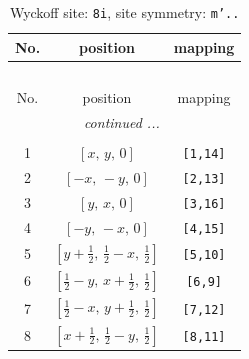 \documentclass[fleqn,8pt]{jsarticle}
\begin{document}
\renewcommand{\arraystretch}{1.2}
\begin{longtable}{ccc}
\caption{Wyckoff site: {\tt 8i}, site symmetry: {\tt m'..}}
 \\
 \hline \hline
No. & position & mapping \\ \hline \endfirsthead

\multicolumn{2}{l}{\tablename\ \thetable{}} \\
 \hline \hline
No. & position & mapping \\ \hline \endhead

 \hline \hline
\multicolumn{2}{r}{\footnotesize\it continued ...} \\ \endfoot

 \hline \hline
\multicolumn{2}{r}{} \\ \endlastfoot

1 & $\left[ x,\, y,\, 0 \right]$ & {\tt [1,14]} \\ \hline
2 & $\left[ - x,\, - y,\, 0 \right]$ & {\tt [2,13]} \\ \hline
3 & $\left[ y,\, x,\, 0 \right]$ & {\tt [3,16]} \\ \hline
4 & $\left[ - y,\, - x,\, 0 \right]$ & {\tt [4,15]} \\ \hline
5 & $\left[ y + \frac{1}{2},\, \frac{1}{2} - x,\, \frac{1}{2} \right]$ & {\tt [5,10]} \\ \hline
6 & $\left[ \frac{1}{2} - y,\, x + \frac{1}{2},\, \frac{1}{2} \right]$ & {\tt [6,9]} \\ \hline
7 & $\left[ \frac{1}{2} - x,\, y + \frac{1}{2},\, \frac{1}{2} \right]$ & {\tt [7,12]} \\ \hline
8 & $\left[ x + \frac{1}{2},\, \frac{1}{2} - y,\, \frac{1}{2} \right]$ & {\tt [8,11]} \\
\end{longtable}
\renewcommand{\arraystretch}{1.2}
\end{document}
